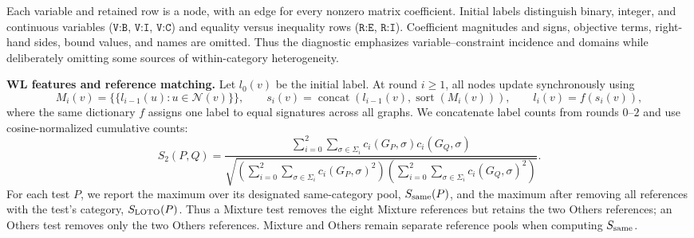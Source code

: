 Each variable and retained row is a node, with an edge for every nonzero
matrix coefficient. Initial labels distinguish binary, integer, and
continuous variables ($\texttt{V:B}$, $\texttt{V:I}$, $\texttt{V:C}$)
and equality versus inequality rows ($\texttt{R:E}$, $\texttt{R:I}$).
Coefficient magnitudes and signs, objective terms, right-hand sides,
bound values, and names are omitted. Thus the diagnostic emphasizes
variable--constraint incidence and domains while deliberately omitting
some sources of within-category heterogeneity.

\medskip
\textbf{WL features and reference matching.}
Let $l_0(v)$ be the initial label. At round $i\geq1$, all nodes update
synchronously using
\[
M_i(v)=\{\!\{l_{i-1}(u):u\in\mathcal N(v)\}\!\},\qquad
s_i(v)=\operatorname{concat}\!\left(l_{i-1}(v),
\operatorname{sort}(M_i(v))\right),\qquad
l_i(v)=f(s_i(v)),
\]
where the same dictionary $f$ assigns one label to equal signatures
across all graphs. We concatenate label counts from rounds $0$--$2$ and
use cosine-normalized cumulative counts:
\[
S_2(P,Q)=
\frac{\displaystyle\sum_{i=0}^{2}\sum_{\sigma\in\Sigma_i}
c_i(G_P,\sigma)c_i(G_Q,\sigma)}
{\displaystyle\sqrt{\left(\sum_{i=0}^{2}\sum_{\sigma\in\Sigma_i}
c_i(G_P,\sigma)^2\right)
\left(\sum_{i=0}^{2}\sum_{\sigma\in\Sigma_i}
c_i(G_Q,\sigma)^2\right)}}.
\]
For each test $P$, we report the maximum over its designated
same-category pool, $S_{\rm same}(P)$, and the maximum after removing
all references with the test's category, $S_{\rm LOTO}(P)$. Thus a
Mixture test removes the eight Mixture references but retains the two
Others references; an Others test removes only the two Others
references. Mixture and Others remain separate reference pools when
computing $S_{\rm same}$.

